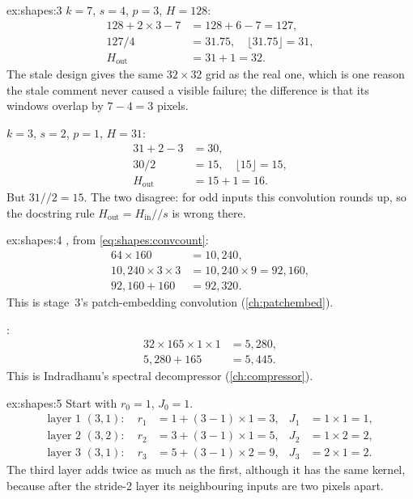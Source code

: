 \begin{solution}{ex:shapes:3}
$k=7$, $s=4$, $p=3$, $H=128$:
\begin{align*}
128 + 2\times3 - 7 &= 128 + 6 - 7 = 127,\\
127/4 &= 31.75,\quad \lfloor 31.75\rfloor = 31,\\
H_{\text{out}} &= 31 + 1 = 32.
\end{align*}
The stale design gives the same $32\times32$ grid as the real one, which is one reason the stale
comment never caused a visible failure; the difference is that its windows overlap by $7-4 = 3$ pixels.

$k=3$, $s=2$, $p=1$, $H=31$:
\begin{align*}
31 + 2 - 3 &= 30,\\
30/2 &= 15,\quad\lfloor15\rfloor = 15,\\
H_{\text{out}} &= 15 + 1 = 16.
\end{align*}
But $31 /\!/ 2 = 15$. The two disagree: for odd inputs this convolution rounds up, so the docstring rule
$H_{\text{out}} = H_{\text{in}} /\!/ s$ is wrong there.
\end{solution}

\begin{solution}{ex:shapes:4}
, from \cref{eq:shapes:convcount}:
\begin{align*}
64\times160 &= 10{,}240,\\
10{,}240\times3\times3 &= 10{,}240\times9 = 92{,}160,\\
92{,}160 + 160 &= 92{,}320.
\end{align*}
This is stage~3's patch-embedding convolution (\cref{ch:patchembed}).

:
\begin{align*}
32\times165\times1\times1 &= 5{,}280,\\
5{,}280 + 165 &= 5{,}445.
\end{align*}
This is Indradhanu's spectral decompressor (\cref{ch:compressor}).
\end{solution}

\begin{solution}{ex:shapes:5}
Start with $r_0 = 1$, $J_0 = 1$.
\begin{align*}
\text{layer 1 } (3,1):\quad r_1 &= 1 + (3-1)\times1 = 3, & J_1 &= 1\times1 = 1,\\
\text{layer 2 } (3,2):\quad r_2 &= 3 + (3-1)\times1 = 5, & J_2 &= 1\times2 = 2,\\
\text{layer 3 } (3,1):\quad r_3 &= 5 + (3-1)\times2 = 9, & J_3 &= 2\times1 = 2.
\end{align*}
The third layer adds twice as much as the first, although it has the same kernel, because after the
stride-2 layer its neighbouring inputs are two pixels apart.
\end{solution}

